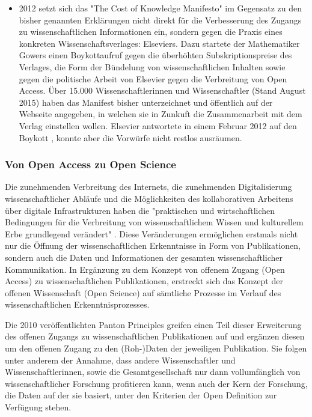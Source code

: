 \begin{itemize}
\item 2012 setzt sich das "The Cost of Knowledge Manifesto" \cite{Gowers_2012} im Gegensatz zu den bisher genannten Erklärungen nicht direkt für die Verbesserung des Zugangs zu wissenschaftlichen Informationen ein, sondern gegen die Praxis eines konkreten Wissenschaftsverlages: Elseviers. Dazu startete der Mathematiker Gowers einen Boykottaufruf gegen die überhöhten Subskriptionspreise des Verlages, die Form der Bündelung von wissenschaftlichen Inhalten sowie gegen die politische Arbeit von Elsevier gegen die Verbreitung von Open Access. Über 15.000 Wissenschaftlerinnen und Wissenschaftler (Stand August 2015) haben das Manifest bisher unterzeichnet und öffentlich auf der Webseite angegeben, in welchen sie in Zunkuft die Zusammenarbeit mit dem Verlag einstellen wollen. Elsevier antwortete in einem Februar 2012 auf den Boykott \cite{elsevier_2012}, konnte aber die Vorwürfe nicht restlos ausräumen.
\end{itemize}

\subsubsection{Von Open Access zu Open Science}

Die zunehmenden Verbreitung des Internets, die zunehmenden Digitalisierung wissenschaftlicher Abläufe und die Möglichkeiten des kollaborativen Arbeitens über digitale Infrastrukturen haben die "praktischen und wirtschaftlichen Bedingungen für die Verbreitung von wissenschaftlichem Wissen und kulturellem Erbe grundlegend verändert" \cite{berliner_erklaerung_2003}. Diese Veränderungen ermöglichen erstmals nicht nur die Öffnung der wissenschaftlichen Erkenntnisse in Form von Publikationen, sondern auch die Daten und Informationen der gesamten wissenschaftlicher Kommunikation. In Ergänzung zu dem Konzept von offenem Zugang (Open Access) zu wissenschaftlichen Publikationen, erstreckt sich das Konzept der offenen Wissenschaft (Open Science) auf sämtliche Prozesse im Verlauf des wissenschaftlichen Erkenntnisprozesses.

Die 2010 veröffentlichten Panton Principles \cite{Mounce_2015} greifen einen Teil dieser Erweiterung des offenen Zugangs zu wissenschaftlichen Publikationen auf und ergänzen diesen um den offenen Zugang zu den (Roh-)Daten der jeweiligen Publikation. Sie folgen unter anderem der Annahme, dass andere Wissenschaftler und Wissenschaftlerinnen, sowie die Gesamtgesellschaft nur dann vollumfänglich von wissenschaftlicher Forschung profitieren kann, wenn auch der Kern der Forschung, die Daten auf der sie basiert, unter den Kriterien der Open Definition \cite{open_definition} zur Verfügung stehen.

